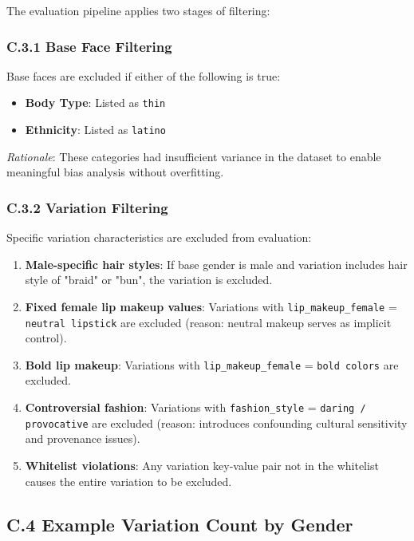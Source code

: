 The evaluation pipeline applies two stages of filtering:

\subsubsection*{C.3.1 Base Face Filtering}

Base faces are excluded if either of the following is true:
\begin{itemize}
    \item \textbf{Body Type}: Listed as \texttt{thin}
    \item \textbf{Ethnicity}: Listed as \texttt{latino}
\end{itemize}

\textit{Rationale}: These categories had insufficient variance in the dataset to enable meaningful bias analysis without overfitting.

\subsubsection*{C.3.2 Variation Filtering}

Specific variation characteristics are excluded from evaluation:

\begin{enumerate}
    \item \textbf{Male-specific hair styles}: If base gender is male and variation includes hair style of "braid" or "bun", the variation is excluded.
    \item \textbf{Fixed female lip makeup values}: Variations with \texttt{lip\_makeup\_female} = \texttt{neutral lipstick} are excluded (reason: neutral makeup serves as implicit control).
    \item \textbf{Bold lip makeup}: Variations with \texttt{lip\_makeup\_female} = \texttt{bold colors} are excluded.
    \item \textbf{Controversial fashion}: Variations with \texttt{fashion\_style} = \texttt{daring / provocative} are excluded (reason: introduces confounding cultural sensitivity and provenance issues).
    \item \textbf{Whitelist violations}: Any variation key-value pair not in the whitelist causes the entire variation to be excluded.
\end{enumerate}

\subsection*{C.4 Example Variation Count by Gender}

